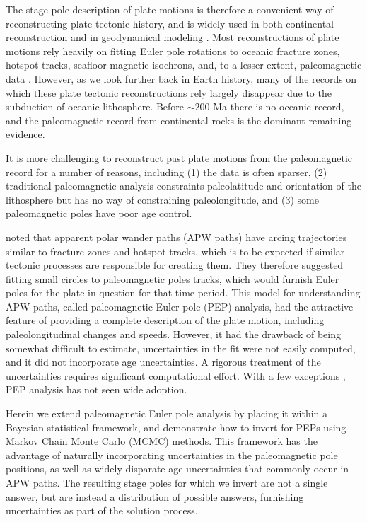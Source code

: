 \documentclass[preprint,12pt,authoryear]{elsarticle}
\begin{document}
The stage pole description of plate motions is therefore a convenient way of reconstructing
plate tectonic history, and is widely used in both continental reconstruction 
\citep[e.g.][]{boyden2011next} and in geodynamical
modeling \citep[e.g.][]{mcnamara2005thermochemical, bull2014effect, rudolph2014history}.
Most reconstructions of plate motions rely heavily on fitting Euler pole rotations
to oceanic fracture zones, hotspot tracks, seafloor magnetic isochrons,
and, to a lesser extent, paleomagnetic data \citep{muller1993revised, seton2012global}.
However, as we look further back in Earth history, many of the records on which these
plate tectonic reconstructions rely largely disappear due to the 
subduction of oceanic lithosphere. Before $\sim$200 Ma there is no oceanic record,
and the paleomagnetic record from continental rocks is the dominant remaining evidence.

It is more challenging to reconstruct past plate motions from the paleomagnetic
record for a number of reasons, including 
(1) the data is often sparser,
(2) traditional paleomagnetic analysis constraints paleolatitude and orientation
of the lithosphere but has no way of constraining paleolongitude, and
(3) some paleomagnetic poles have poor age control.

\citet{gordon1984paleomagnetic} noted that apparent polar wander paths (APW paths) have 
arcing trajectories similar to fracture zones and hotspot tracks, which is
to be expected if similar tectonic processes are responsible for creating them.
They therefore suggested fitting small circles to paleomagnetic poles tracks,
which would furnish Euler poles for the plate in question for that time period.
This model for understanding APW paths, called paleomagnetic Euler pole (PEP) analysis,
 had the attractive feature of providing a complete description of the plate motion, 
including paleolongitudinal changes and speeds. 
However, it had the drawback of being somewhat difficult to estimate,
uncertainties in the fit were not easily computed, 
and it did not incorporate age uncertainties. 
A rigorous treatment of the uncertainties requires significant computational effort.
With a few exceptions \citep[e.g.][]{beck1989paleomagnetism, tarling1996palaeomagnetic, bryan1986rotation, beck2003absolute, smirnov2010co},
PEP analysis has not seen wide adoption.

Herein we extend paleomagnetic Euler pole analysis by placing it within
a Bayesian statistical framework, and demonstrate how to invert for PEPs
using Markov Chain Monte Carlo (MCMC) methods. This framework has the advantage
of naturally incorporating uncertainties in the paleomagnetic pole positions,
as well as widely disparate age uncertainties that commonly occur in APW paths.
The resulting stage poles for which we invert are not a single answer, but are instead
a distribution of possible answers, furnishing uncertainties as part of the solution process.
\end{document}
